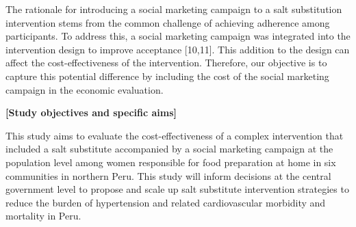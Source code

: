 \documentclass[12pt]{report}
\begin{document}
The rationale for introducing a social marketing campaign to a salt substitution intervention stems from the common challenge of achieving adherence among participants. To address this, a social marketing campaign was integrated into the intervention design to improve acceptance [10,11]. This addition to the design can affect the cost-effectiveness of the intervention. Therefore, our objective is to capture this potential difference by including the cost of the social marketing campaign in the economic evaluation.

\vspace{0.5cm}
\noindent\textbf{[Study objectives and specific aims]}

This study aims to evaluate the cost-effectiveness of a complex intervention that included a salt substitute accompanied by a social marketing campaign at the population level among women responsible for food preparation at home in six communities in northern Peru. This study will inform decisions at the central government level to propose and scale up salt substitute intervention strategies to reduce the burden of hypertension and related cardiovascular morbidity and mortality in Peru.
\end{document}
